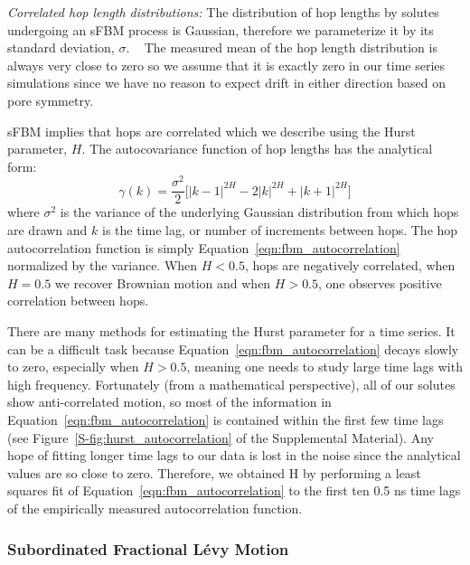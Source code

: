 \documentclass[aps,pre,preprint,groupedaddress,longbibliography]{revtex4-2}
\begin{document}
  \textit{Correlated hop length distributions:} The distribution of hop 
  lengths by solutes undergoing an sFBM process is Gaussian, therefore we 
  parameterize it by its standard deviation, $\sigma$.
  ~\cite{metzler_random_2000, metzler_anomalous_2014,neusius_subdiffusion_2009}
  The measured mean of the hop length distribution is always very close to zero so
  we assume that it is exactly zero in our time series simulations since we have 
  no reason to expect drift in either direction based on pore symmetry.

  sFBM implies that hops are correlated which we describe using the Hurst
  parameter, $H$. The autocovariance function of hop lengths has the
  analytical form:~\cite{mandelbrot_fractional_1968}
  \begin{equation}
    \gamma(k) = \dfrac{\sigma^2}{2}\bigg[|k-1|^{2H} - 2|k|^{2H} + |k+1|^{2H}\bigg]
  \label{eqn:fbm_autocorrelation}
  \end{equation}
  where $\sigma^2$ is the variance of the underlying Gaussian distribution from
  which hops are drawn and $k$ is the time lag, or number of increments between
  hops. The hop autocorrelation function is simply
  Equation~\ref{eqn:fbm_autocorrelation} normalized by the variance.  When $H <
  0.5$, hops are negatively correlated, when $H = 0.5$ we recover Brownian
  motion and when $H > 0.5$, one observes positive correlation between hops. 
 
  There are many methods for estimating the Hurst parameter for a time series.
  \cite{clegg_practical_2006} It can be a difficult task because 
  Equation~\ref{eqn:fbm_autocorrelation} decays slowly to zero, especially when 
  $H > 0.5$, meaning one needs to study large time lags with high frequency.
  Fortunately (from a mathematical perspective), all of our solutes show anti-correlated motion, so most of the information in
  Equation~\ref{eqn:fbm_autocorrelation} is contained within the first few time lags (see 
  Figure~\ref{S-fig:hurst_autocorrelation} of the Supplemental Material). Any hope of
  fitting longer time lags to our data is lost in the noise since the analytical values
  are so close to zero. Therefore, we obtained H by performing a least squares fit of 
  Equation~\ref{eqn:fbm_autocorrelation} to the first 
  ten 0.5 ns time lags of the empirically measured autocorrelation function.

  \subsubsection{Subordinated Fractional L\'evy Motion}\label{method:sflm}
\end{document}
